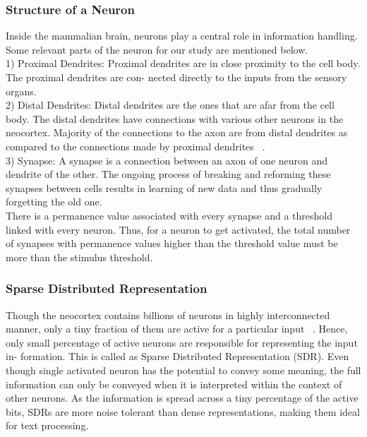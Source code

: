 \documentclass[12pt]{article}
\begin{document}
\begin{multicols}{2}
\subsubsection{Structure of a Neuron}\label{AA}
Inside the mammalian brain, neurons play a central role in
information handling. Some relevant parts of the neuron for
our study are mentioned below.\\
1) Proximal Dendrites: Proximal dendrites are in close
proximity to the cell body. The proximal dendrites are con-
nected directly to the inputs from the sensory organs.\\
2) Distal Dendrites: Distal dendrites are the ones that are
afar from the cell body. The distal dendrites have connections
with various other neurons in the neocortex. Majority of the
connections to the axon are from distal dendrites as compared
to the connections made by proximal dendrites ~\cite{8}.\\
3) Synapse: A synapse is a connection between an axon of
one neuron and dendrite of the other. The ongoing process of
breaking and reforming these synapses between cells results
in learning of new data and thus gradually forgetting the old
one.\\
There is a permanence value associated with every synapse
and a threshold linked with every neuron. Thus, for a neuron
to get activated, the total number of synapses with permanence
values higher than the threshold value must be more than the
stimulus threshold.
\subsubsection{Sparse Distributed Representation}
Though the neocortex contains billions of neurons in highly
interconnected manner, only a tiny fraction of them are active
for a particular input ~\cite{9}. Hence, only small percentage of
active neurons are responsible for representing the input in-
formation. This is called as Sparse Distributed Representation
(SDR). Even though single activated neuron has the potential
to convey some meaning, the full information can only be
conveyed when it is interpreted within the context of other
neurons. As the information is spread across a tiny percentage
of the active bits, SDRs are more noise tolerant than dense
representations, making them ideal for text processing.


\end{multicols}
\end{document}
